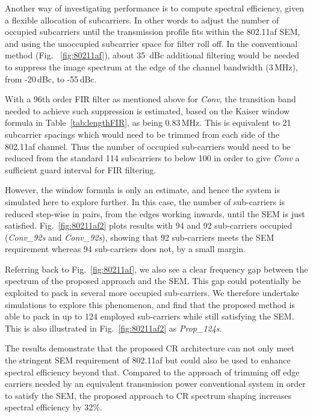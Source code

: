 Another way of investigating performance is to compute spectral efficiency, given a flexible allocation of subcarriers.
In other words to adjust the number of occupied subcarriers until the transmission profile fits within the 802.11af SEM, and using the unoccupied subcarrier space for filter roll off.
In the conventional method (Fig. ~\ref{fig:80211af}), about 35~dBc additional filtering would be needed to suppress the image spectrum at the edge of the channel bandwidth (3\,MHz), from -20\,dBc, to -55\,dBc.

With a 96th order FIR filter as mentioned above for \emph{Conv}, the transition band needed to achieve such suppression is estimated, based on the Kaiser window formula in Table~\ref{tab:lengthFIR}, as being 0.83\,MHz.
This is equivalent to 21 subcarrier spacings which would need to be trimmed from each side of the 802.11af channel.
Thus the number of occupied sub-carriers would need to be reduced from the standard 114 subcarriers to below 100 in order to give \emph{Conv} a sufficient guard interval for FIR filtering.

However, the window formula is only an estimate, and hence the system is simulated here to explore further.
In this case, the number of sub-carriers is reduced step-wise in pairs, from the edges working inwards, until the SEM is just satisfied.
Fig.~\ref{fig:80211af2} plots results with 94 and 92 sub-carriers occupied (\emph{Conv\_92s} and \emph{Conv\_92s}), showing that 92 sub-carriers meets the SEM requirement whereas 94 sub-carriers does not, by a small margin.

Referring back to Fig.~\ref{fig:80211af}, we also see a clear frequency gap between the spectrum of the proposed approach and the SEM.
This gap could potentially be exploited to pack in several more occupied sub-carriers.
We therefore undertake simulations to explore this phenomenon, and find that the proposed method is able to pack in up to 124 employed sub-carriers while still satisfying the SEM.
This is also illustrated in Fig.~\ref{fig:80211af2} as \emph{Prop\_124s}.

The results demonstrate that the proposed CR architecture can not only meet the stringent SEM requirement of 802.11af but could also be used to enhance spectral efficiency beyond that.
Compared to the approach of trimming off edge carriers needed by an equivalent transmission power conventional system in order to satisfy the SEM, the proposed approach to CR spectrum shaping increases spectral efficiency by 32\%.

